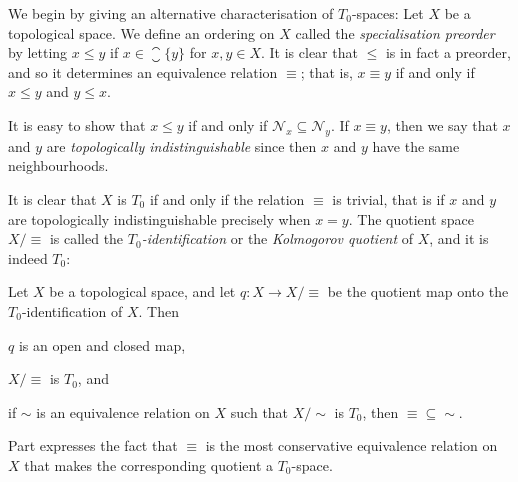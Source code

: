 \documentclass[article, a4paper, 11pt, oneside]{memoir}
\numberwithin{equation}{chapter}
\newcommand{\calN}{\mathcal{N}}
\newcommand{\nhoodfilter}[1]{\calN_{#1}}
\begin{document}
We begin by giving an alternative characterisation of $T_0$-spaces: Let $X$ be a topological space. We define an ordering on $X$ called the \emph{specialisation preorder} by letting $x \leq y$ if $x \in \closure{\{y\}}$ for $x,y \in X$. It is clear that $\leq$ is in fact a preorder, and so it determines an equivalence relation $\equiv$; that is, $x \equiv y$ if and only if $x \leq y$ and $y \leq x$.

It is easy to show that $x \leq y$ if and only if $\nhoodfilter{x} \subseteq \nhoodfilter{y}$.  If $x \equiv y$, then we say that $x$ and $y$ are \emph{topologically indistinguishable} since then $x$ and $y$ have the same neighbourhoods.

It is clear that $X$ is $T_0$ if and only if the relation $\equiv$ is trivial, that is if $x$ and $y$ are topologically indistinguishable precisely when $x = y$. The quotient space $X/{\equiv}$ is called the \emph{$T_0$-identification} or the \emph{Kolmogorov quotient} of $X$, and it is indeed $T_0$:

\begin{proposition}[$T_0$-identification]
    Let $X$ be a topological space, and let $q \colon X \to X/{\equiv}$ be the quotient map onto the $T_0$-identification of $X$. Then
    \begin{enumprop}
        \item $q$ is an open and closed map,
        \item $X/{\equiv}$ is $T_0$, and
        \item \label{enum:T0-identification-is-smallest-equiv} if $\sim$ is an equivalence relation on $X$ such that $X/{\sim}$ is $T_0$, then ${\equiv} \subseteq {\sim}$.\footnotemark
    \end{enumprop}
\end{proposition}
%
Part  expresses the fact that $\equiv$ is the most conservative equivalence relation on $X$ that makes the corresponding quotient a $T_0$-space.
\end{document}
